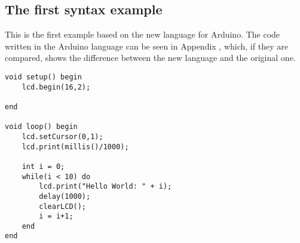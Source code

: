\subsection{The first syntax example}
This is the first example based on the new language for Arduino. The code written in the Arduino language can be seen in Appendix , which, if they are compared, shows the difference between the new language and the original one.
\begin{lstlisting}
void setup() begin
    lcd.begin(16,2);
    
end

void loop() begin
    lcd.setCursor(0,1);
    lcd.print(millis()/1000);
    
    int i = 0;
    while(i < 10) do
        lcd.print("Hello World: " + i);
        delay(1000);
        clearLCD();
        i = i+1;
    end
end
\end{lstlisting}